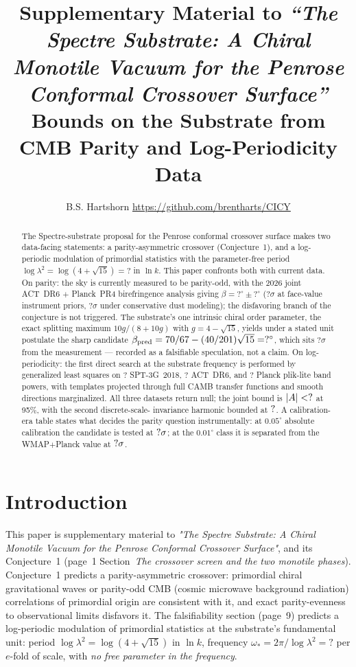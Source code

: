 \documentclass[11pt,a4paper]{article}
\title{\vspace{-1cm}\textbf{Supplementary Material to 
\emph{``The Spectre Substrate: A Chiral Monotile Vacuum for the Penrose Conformal Crossover Surface''} \\ [2pt]
\large Bounds on the Substrate from CMB Parity and Log-Periodicity Data}}
\author{B.S. Hartshorn \orcidlink{0009-0004-2853-655X} \small
\url{https://github.com/brentharts/CICY}}
\newcommand{\CFBetaMeasured}{?}\newcommand{\CFBetaPred}{?}
\newcommand{\CFBetaPull}{?}\newcommand{\CFBetaSigma}{?}
\newcommand{\CFBetaZDust}{?}\newcommand{\CFBetaZFace}{?}
\newcommand{\CFLogPeriod}{?}\newcommand{\CFNBinsACT}{?}
\newcommand{\CFNBinsPlanck}{?}\newcommand{\CFNBinsSPT}{?}
\newcommand{\CFOmegaStar}{?}\newcommand{\CFPeriodFactor}{?}
\newcommand{\lam}{\lambda}
\theoremstyle{plain}
\theoremstyle{definition}
\begin{document}
\maketitle

\begin{abstract}
The Spectre-substrate proposal for the Penrose conformal crossover surface makes
two data-facing statements: a parity-asymmetric crossover
(Conjecture~1), and a log-periodic modulation of primordial
statistics with the parameter-free period
$\log\lam^{2}=\log(4+\sqrt{15})=\CFLogPeriod$ in $\ln k$. This paper
confronts both with current data. On parity: the sky is currently
measured to be parity-odd, with the 2026 joint ACT~DR6 $+$ Planck~PR4
birefringence analysis giving $\beta=\CFBetaMeasured^{\circ}\pm
\CFBetaSigma^{\circ}$ ($\CFBetaZFace\sigma$ at face-value instrument
priors, $\CFBetaZDust\sigma$ under conservative dust modeling); the
disfavoring branch of the conjecture is not triggered. The substrate's
one intrinsic chiral order parameter, the exact splitting maximum
$10g/(8+10g)$ with $g=4-\sqrt{15}$, yields under a stated unit postulate
the sharp candidate $\beta_{\rm pred}=70/67-(40/201)\sqrt{15}=
\CFBetaPred^{\circ}$, which sits $\CFBetaPull\sigma$ from the
measurement --- recorded as a falsifiable speculation, not a claim. On
log-periodicity: the first direct search at the substrate frequency is
performed by generalized least squares on $\CFNBinsSPT$ SPT-3G~2018,
$\CFNBinsACT$ ACT~DR6, and $\CFNBinsPlanck$ Planck plik-lite band
powers, with templates projected through full CAMB transfer functions
and smooth directions marginalized. All three datasets return null; the
joint bound is $|A|<?$ at 95\%, with the second discrete-scale-
invariance harmonic bounded at $?$. A calibration-era table
states what decides the parity question instrumentally: at
$0.05^{\circ}$ absolute calibration the candidate is tested at
$?\sigma$; at the $0.01^{\circ}$ class it is separated from
the WMAP$+$Planck value at $?\sigma$.
\end{abstract}

\tableofcontents

\section{Introduction}
\label{sec:intro}

This paper is supplementary material to
\emph{"The Spectre Substrate: A Chiral Monotile Vacuum for the Penrose Conformal Crossover Surface"},
and its Conjecture~1 (page~1 Section~\emph{The crossover screen and the two monotile phases}).
Conjecture~1 predicts a parity-asymmetric crossover: primordial chiral gravitational waves or
parity-odd CMB (cosmic microwave background radiation) correlations of primordial origin are consistent with it,
and exact parity-evenness to observational limits disfavors it. 
The falsifiability section (page~9) predicts a log-periodic modulation of primordial statistics at the substrate's fundamental unit: period
$\log\lam^{2}=\log(4+\sqrt{15})$ in $\ln k$, frequency
$\omega_{*}=2\pi/\log\lam^{2}=\CFOmegaStar$ per $e$-fold of scale, with
\emph{no free parameter in the frequency}.
\end{document}
